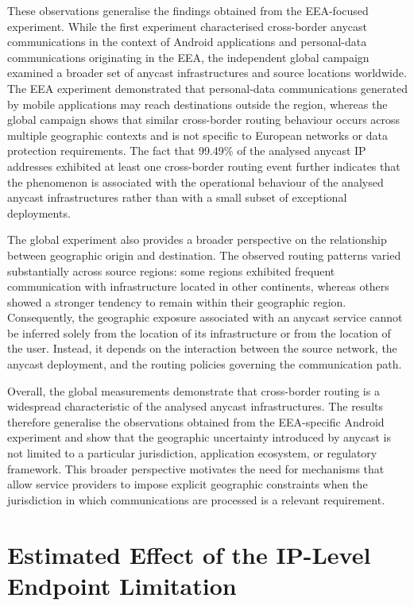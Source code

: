 These observations generalise the findings obtained from the EEA-focused experiment. While the first experiment characterised cross-border anycast communications in the context of Android applications and personal-data communications originating in the EEA, the independent global campaign examined a broader set of anycast infrastructures and source locations worldwide. The EEA experiment demonstrated that personal-data communications generated by mobile applications may reach destinations outside the region, whereas the global campaign shows that similar cross-border routing behaviour occurs across multiple geographic contexts and is not specific to European networks or data protection requirements. The fact that 99.49\% of the analysed anycast IP addresses exhibited at least one cross-border routing event further indicates that the phenomenon is associated with the operational behaviour of the analysed anycast infrastructures rather than with a small subset of exceptional deployments.

The global experiment also provides a broader perspective on the relationship between geographic origin and destination. The observed routing patterns varied substantially across source regions: some regions exhibited frequent communication with infrastructure located in other continents, whereas others showed a stronger tendency to remain within their geographic region. Consequently, the geographic exposure associated with an anycast service cannot be inferred solely from the location of its infrastructure or from the location of the user. Instead, it depends on the interaction between the source network, the anycast deployment, and the routing policies governing the communication path.

Overall, the global measurements demonstrate that cross-border routing is a widespread characteristic of the analysed anycast infrastructures. The results therefore generalise the observations obtained from the EEA-specific Android experiment and show that the geographic uncertainty introduced by anycast is not limited to a particular jurisdiction, application ecosystem, or regulatory framework. This broader perspective motivates the need for mechanisms that allow service providers to impose explicit geographic constraints when the jurisdiction in which communications are processed is a relevant requirement.

\section{Estimated Effect of the IP-Level Endpoint Limitation}
\label{sc:anycast_experiments_scenarios}

